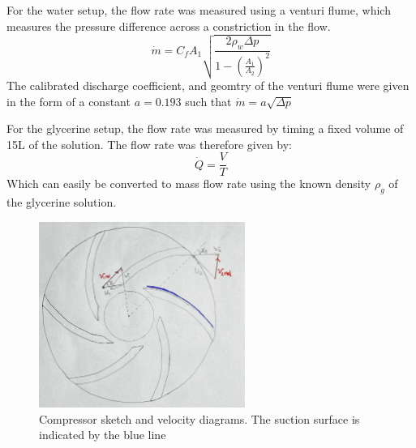 \documentclass{article}
\begin{document}
For the water setup, the flow rate was measured using a venturi flume, which measures the pressure difference across a constriction in the flow.
\begin{equation}
    \dot{m} = C_f A_1 \sqrt{\frac{2\rho_w \Delta p}{1 - \left( \frac{A_1}{A_2} \right)^2}}
\end{equation}
The calibrated discharge coefficient, and geomtry of the venturi flume were given in the form of a constant $a=0.193$ such that $\dot{m}=a \sqrt{\Delta p}$

For the glycerine setup, the flow rate was measured by timing a fixed volume of 15L of the solution.
The flow rate was therefore given by:
\begin{equation}
    \dot{Q} = \frac{V}{T}
\end{equation}
Which can easily be converted to mass flow rate using the known density $\rho_g$ of the glycerine solution.




\begin{figure}[H]
    \centering
    \includegraphics[width=0.6\textwidth]{velocity_diagrams.jpg}
    \caption{Compressor sketch and velocity diagrams. The suction surface is indicated by the blue line}
    \label{fig:vel_diagrams}
\end{figure}

\end{document}
